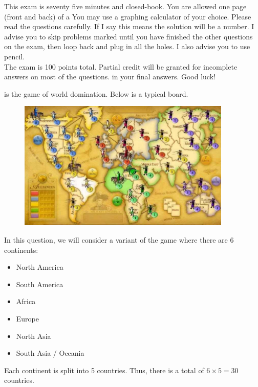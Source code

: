 \documentclass[12pt]{article}
\begin{document}
This exam is seventy five minutes and closed-book. You are allowed one page (front and back) of a  You may use a graphing calculator of your choice. Please read the questions carefully. If I say  this means the solution will be a number. I advise you to skip problems marked  until you have finished the other questions on the exam, then loop back and plug in all the holes. I also advise you to use pencil.\\

\noindent The exam is 100 points total. Partial credit will be granted for incomplete answers on most of the questions.  in your final answers. Good luck!

\pagebreak

\problem {} is the game of world domination. Below is a typical board.

\begin{figure}[htp]
\centering
\includegraphics[width=4in]{risk.png}
\end{figure}

In this question, we will consider a variant of the game where there are 6 continents:

\vspace{-0.25cm}
\begin{itemize}
\setlength{\itemsep}{-6pt}
\item North America
\item South America
\item Africa
\item Europe
\item North Asia
\item South Asia / Oceania
\end{itemize}
\vspace{-0.25cm}

Each continent is split into 5 countries. Thus, there is a total of $6 \times 5 = 30$ countries.
\end{document}
